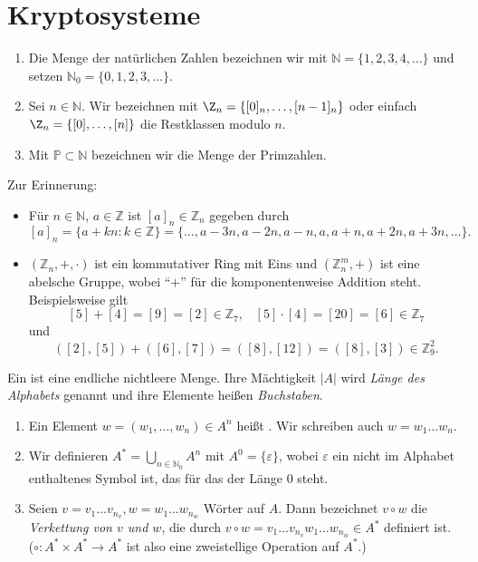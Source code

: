 \section{Kryptosysteme}

\begin{notation}
 \begin{enumerate}
  \item Die Menge der natürlichen Zahlen bezeichnen wir mit $ℕ = \{1, 2, 3, 4, \dotsc\}$ und setzen $ℕ_0 = \{0, 1, 2, 3, \dotsc\}$.
  \item Sei $n \in ℕ$. Wir bezeichnen mit $\Z_n = \{\ol 0_n, \dotsc, \ol {n-1}_n\}$ oder einfach $\Z_n = \{\ol 0, \dotsc, \ol n\}$ die Restklassen modulo $n$.
  \item Mit $\mathbb P \subset ℕ$ bezeichnen wir die Menge der Primzahlen. 
 \end{enumerate}
\end{notation}

Zur Erinnerung: 
\begin{itemize}
 \item Für $n \in ℕ$, $a \in ℤ$ ist $[a]_n \in ℤ_n$ gegeben durch 
 \[[a]_n = \{a + kn : k \in ℤ\} = \{\dotsc, a - 3n, a -2n, a -n , a , a + n, a +2n, a + 3n, \dotsc\}.\]
 \item $(ℤ_n, +, \cdot)$ ist ein kommutativer Ring mit Eins und $(ℤ_n^m, +)$ ist eine abelsche Gruppe, wobei \enquote{$+$} für die komponentenweise Addition steht. Beispielsweise gilt 
 \[[5] + [4] = [9] = [2] \in ℤ_7, \;\;\; [5] \cdot [4] = [20] = [6] \in ℤ_7\]
 und 
 \[([2], [5]) + ([6], [7]) = ([8], [12]) = ([8], [3]) \in ℤ_9^2.\] 
\end{itemize}
\begin{definition}
Ein  ist eine endliche nichtleere Menge. Ihre Mächtigkeit $|A|$ wird \emph{Länge des Alphabets} genannt und ihre Elemente heißen \emph{Buchstaben}. 
\begin{enumerate}
 \item Ein Element $w = (w_1, \dots, w_n) \in A^n$ heißt . Wir schreiben auch $w = w_1\dots w_n$.
 \item Wir definieren $A^* = \bigcup_{n \in ℕ_0} A^n$ mit $A^0 = \{\varepsilon\}$, wobei $\varepsilon$ ein nicht im Alphabet enthaltenes Symbol ist, das für das  der Länge $0$ steht.
 \item Seien $v = v_1\dots v_{n_v}, w = w_1\dots w_{n_w}$ Wörter auf $A$. Dann bezeichnet $v \circ w$ die \emph{Verkettung von $v$ und $w$}, die durch $v \circ w = v_1\dots v_{n_v} w_1\dots w_{n_w} \in A^*$ definiert ist. \\ ($\circ: A^* \times A^* → A^*$ ist also eine zweistellige Operation auf $A^*$.)
\end{enumerate}
\end{definition}

